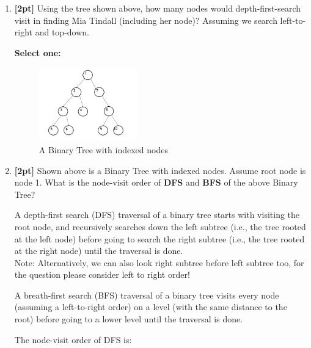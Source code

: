 \documentclass[12pt]{article}
\renewcommand{\circle}{\tikz\draw[black] (0,0) circle (1ex);}
\begin{document}
\begin{enumerate}
    \item \textbf{[2pt]} Using the tree shown above, how many nodes would depth-first-search visit in finding Mia Tindall (including her node)? Assuming we search left-to-right and top-down.

    \textbf{Select one:}

    
    \begin{figure}[H]
        \centering
        \includegraphics[width = 0.4\textwidth]{TreePlot.png}
        \caption{A Binary Tree with indexed nodes}
        \label{tree}
    \end{figure}
    \item \textbf{[2pt]} Shown above is a Binary Tree with indexed nodes. Assume root node is node 1. What is the node-visit order of \textbf{DFS} and \textbf{BFS} of the above Binary Tree? 
    
    A depth-first search (DFS) traversal of a binary tree starts with visiting the root node, and recursively searches down the left subtree (i.e., the tree rooted at the left node) before going to search the right subtree (i.e., the tree rooted at the right node) until the traversal is done.\\
    Note: Alternatively, we can also look right subtree before left subtree too, for the question please consider left to right order!
    
    A breath-first search (BFS) traversal of a binary tree visits every node (assuming a left-to-right order) on a level (with the same distance to the root) before going to a lower level until the traversal is done.
    
    The node-visit order of DFS is:
    
    \begin{tcolorbox}[fit,height=1cm, width=\textwidth, blank, borderline={1pt}{-2pt},nobeforeafter]
    \end{tcolorbox}
    

\end{enumerate}
\end{document}
